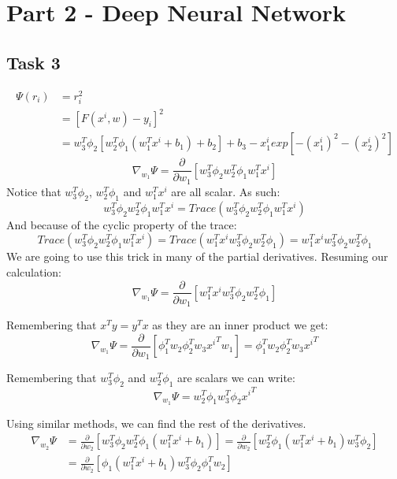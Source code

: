 \documentclass[12pt]{scrartcl}
\begin{document}
\section*{Part 2 - Deep Neural Network}
\subsection*{Task 3}
\begin{align*}
\Psi(r_i)&=r_i^2\\
&=[F(x^i,w)-y_i]^2\\
&=w_3^T\phi_2[w_2^T\phi_1(w_1^Tx^i+b_1)+b_2]+b_3 -x_1^i exp[-(x_1^i)^2-(x_2^i)^2]
\end{align*}
$$\nabla_{w_1}\Psi=\frac{\partial}{\partial w_1}[w_3^T\phi_2w_2^T\phi_1w_1^Tx^i]$$
Notice that $w_3^T\phi_2$, $w_2^T\phi_1$ and $w_1^Tx^i$ are all scalar. As such:
$$w_3^T\phi_2w_2^T\phi_1w_1^Tx^i = Trace(w_3^T\phi_2w_2^T\phi_1w_1^Tx^i)$$
And because of the cyclic property of the trace:
$$Trace(w_3^T\phi_2w_2^T\phi_1w_1^Tx^i)=Trace(w_1^Tx^iw_3^T\phi_2w_2^T\phi_1)=w_1^Tx^iw_3^T\phi_2w_2^T\phi_1$$
We are going to use this trick in many of the partial derivatives. Resuming our calculation:
$$\nabla_{w_1}\Psi=\frac{\partial}{\partial w_1}[w_1^Tx^iw_3^T\phi_2w_2^T\phi_1]$$

Remembering that $x^Ty=y^Tx$ as they are an inner product we get:
$$\nabla_{w_1}\Psi=\frac{\partial}{\partial w_1}[\phi_1^Tw_2\phi_2^Tw_3{x^i}^Tw_1]=\phi_1^Tw_2\phi_2^Tw_3{x^i}^T$$

Remembering that $w_3^T\phi_2$ and $w_2^T\phi_1$ are scalars we can write:
$$\nabla_{w_1}\Psi=w_2^T\phi_1w_3^T\phi_2{x^i}^T$$

\begin{center}
\end{center}

Using similar methods, we can find the rest of the derivatives.
\begin{align*}
\nabla_{w_2}\Psi&=\frac{\partial}{\partial w_2}[w_3^T\phi_2w_2^T\phi_1(w_1^Tx^i+b_1)]=\frac{\partial}{\partial w_2}[w_2^T\phi_1(w_1^Tx^i+b_1)w_3^T\phi_2]\\
&=\frac{\partial}{\partial w_2}[\phi_1(w_1^Tx^i+b_1)w_3^T\phi_2\phi_1^Tw_2]
\end{align*}

\begin{center}
\end{center}
\end{document}
